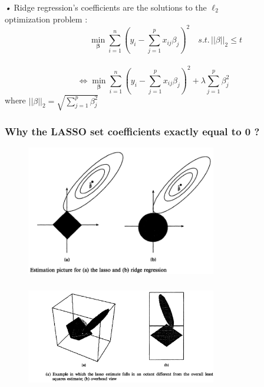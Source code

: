 \documentclass{beamer}
\begin{document}
\begin{frame}
\emph{•} Ridge regression's coefficients are the solutions to the $\ell_2$
\\\quad optimization problem :
\\\begin{equation*}
\quad\quad\quad \min\limits_{\boldsymbol{\beta}}\sum_{i=1}^n(y_i-\sum_{j=1}^px_{ij}\beta_j)^2 \quad s.t.\, ||\beta||_2\leq{t}
\end{equation*} 
\\\begin{equation*}
\Leftrightarrow \min\limits_{\boldsymbol{\beta}}\sum_{i=1}^n(y_i-\sum_{j=1}^px_{ij}\beta_j)^2+\lambda\sum_{j=1}^p\beta_j^2
\end{equation*}
\quad where $||\beta||_2 =\sqrt{ \sum_{j=1}^p\beta_j^2}$
\end{frame}

\begin{frame}
\frametitle{Why the LASSO set coefficients exactly equal to 0 ? }
\begin{figure}[h]
\begin{center}
\includegraphics[width=8.3cm]{image06}
\end{center}
\end{figure}
\end{frame}



\begin{frame}
\frametitle{}
\begin{figure}[h]
	\begin{center}
		\includegraphics[width=8.3cm]{3_dimension}
	\end{center}
\end{figure}
\end{frame}
\end{document}
